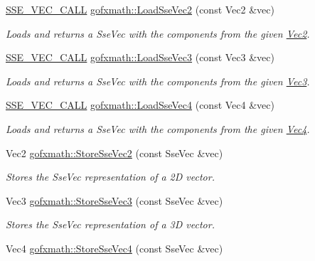 \begin{DoxyCompactItemize}
\hyperlink{ssevec__math__defs_8h_a97454f977a5281455cecacce1e8ba670}{S\+S\+E\+\_\+\+V\+E\+C\+\_\+\+C\+A\+L\+L} \hyperlink{group___s_i_m_d_vec_math_gabe3a018b9d6a7bfd471e9e79c6d426b4}{gofxmath\+::\+Load\+Sse\+Vec2} (const Vec2 \&vec)
\begin{DoxyCompactList}\small\item\em Loads and returns a Sse\+Vec with the components from the given \hyperlink{classgofxmath_1_1_vec2}{Vec2}. \end{DoxyCompactList}\item 
\hyperlink{ssevec__math__defs_8h_a97454f977a5281455cecacce1e8ba670}{S\+S\+E\+\_\+\+V\+E\+C\+\_\+\+C\+A\+L\+L} \hyperlink{group___s_i_m_d_vec_math_gae96ebc5e457de66eef7e98cd376091c6}{gofxmath\+::\+Load\+Sse\+Vec3} (const Vec3 \&vec)
\begin{DoxyCompactList}\small\item\em Loads and returns a Sse\+Vec with the components from the given \hyperlink{classgofxmath_1_1_vec3}{Vec3}. \end{DoxyCompactList}\item 
\hyperlink{ssevec__math__defs_8h_a97454f977a5281455cecacce1e8ba670}{S\+S\+E\+\_\+\+V\+E\+C\+\_\+\+C\+A\+L\+L} \hyperlink{group___s_i_m_d_vec_math_gab6df575aef0bbd218edfd71d72595355}{gofxmath\+::\+Load\+Sse\+Vec4} (const Vec4 \&vec)
\begin{DoxyCompactList}\small\item\em Loads and returns a Sse\+Vec with the components from the given \hyperlink{classgofxmath_1_1_vec4}{Vec4}. \end{DoxyCompactList}\item 
Vec2 \hyperlink{group___s_i_m_d_vec_math_ga40c204913db7670aba5504b920c123ce}{gofxmath\+::\+Store\+Sse\+Vec2} (const Sse\+Vec \&vec)
\begin{DoxyCompactList}\small\item\em Stores the Sse\+Vec representation of a 2\+D vector. \end{DoxyCompactList}\item 
Vec3 \hyperlink{group___s_i_m_d_vec_math_gac4ff1b6370eaf567846d209b4068bc75}{gofxmath\+::\+Store\+Sse\+Vec3} (const Sse\+Vec \&vec)
\begin{DoxyCompactList}\small\item\em Stores the Sse\+Vec representation of a 3\+D vector. \end{DoxyCompactList}\item 
Vec4 \hyperlink{group___s_i_m_d_vec_math_ga451a176ebe90e4e965ee7e9def06b240}{gofxmath\+::\+Store\+Sse\+Vec4} (const Sse\+Vec \&vec)

\end{DoxyCompactItemize}
